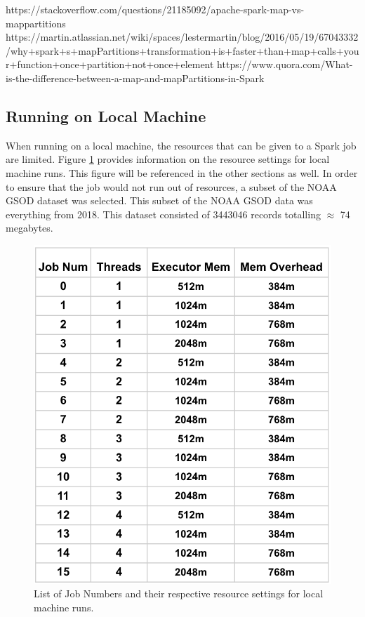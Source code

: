 \documentclass[conference]{IEEEtran}
\begin{document}
https://stackoverflow.com/questions/21185092/apache-spark-map-vs-mappartitions
https://martin.atlassian.net/wiki/spaces/lestermartin/blog/2016/05/19/67043332/why+spark+s+mapPartitions+transformation+is+faster+than+map+calls+your+function+once+partition+not+once+element
https://www.quora.com/What-is-the-difference-between-a-map-and-mapPartitions-in-Spark

\subsection{Running on Local Machine}

When running on a local machine, the resources that can be given to a Spark job are limited.
Figure \ref{fig:localjobs} provides information on the resource settings for local machine runs.
This figure will be referenced in the other sections as well.
In order to ensure that the job would not run out of resources, a subset of the NOAA GSOD dataset was selected.
This subset of the NOAA GSOD data was everything from 2018.
This dataset consisted of 3443046 records totalling $\approx$ 74 megabytes.

\begin{figure}
    \includegraphics[width=\linewidth]{presentation_table.PNG}
    \caption{List of Job Numbers and their respective resource settings for local machine runs.}
    \label{fig:localjobs}
\end{figure}
\end{document}
